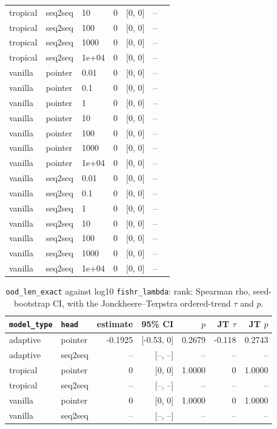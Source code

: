 \documentclass[10pt]{article}
\begin{document}
{\begin{longtable}{lllrrrl}
tropical & seq2seq & 10 & 0 & [0, 0] & -- & \\
tropical & seq2seq & 100 & 0 & [0, 0] & -- & \\
tropical & seq2seq & 1000 & 0 & [0, 0] & -- & \\
tropical & seq2seq & 1e+04 & 0 & [0, 0] & -- & \\
vanilla & pointer & 0.01 & 0 & [0, 0] & -- & \\
vanilla & pointer & 0.1 & 0 & [0, 0] & -- & \\
vanilla & pointer & 1 & 0 & [0, 0] & -- & \\
vanilla & pointer & 10 & 0 & [0, 0] & -- & \\
vanilla & pointer & 100 & 0 & [0, 0] & -- & \\
vanilla & pointer & 1000 & 0 & [0, 0] & -- & \\
vanilla & pointer & 1e+04 & 0 & [0, 0] & -- & \\
vanilla & seq2seq & 0.01 & 0 & [0, 0] & -- & \\
vanilla & seq2seq & 0.1 & 0 & [0, 0] & -- & \\
vanilla & seq2seq & 1 & 0 & [0, 0] & -- & \\
vanilla & seq2seq & 10 & 0 & [0, 0] & -- & \\
vanilla & seq2seq & 100 & 0 & [0, 0] & -- & \\
vanilla & seq2seq & 1000 & 0 & [0, 0] & -- & \\
vanilla & seq2seq & 1e+04 & 0 & [0, 0] & -- & \\
\bottomrule
\end{longtable}
}

{\small
\begin{longtable}{llrrrrr}
\caption{\texttt{ood\_len\_exact} against log10 \texttt{fishr\_lambda}: rank: Spearman rho, seed-bootstrap CI, with the Jonckheere--Terpstra ordered-trend $\tau$ and $p$.}\label{tab:trend-ood_len_exact}\\
\toprule
\texttt{model\_type} & \texttt{head} & estimate & 95\% CI & $p$ & JT $\tau$ & JT $p$\\
\midrule
\endhead
adaptive & pointer & -0.1925 & [-0.53, 0] & 0.2679 & -0.118 & 0.2743\\
adaptive & seq2seq & -- & [--, --] & -- & -- & --\\
tropical & pointer & 0 & [0, 0] & 1.0000 & 0 & 1.0000\\
tropical & seq2seq & -- & [--, --] & -- & -- & --\\
vanilla & pointer & 0 & [0, 0] & 1.0000 & 0 & 1.0000\\
vanilla & seq2seq & -- & [--, --] & -- & -- & --\\
\bottomrule
\end{longtable}
}
\end{document}
